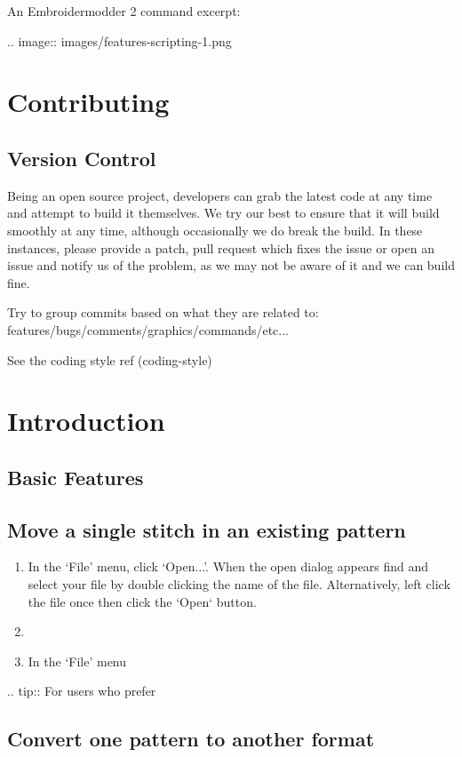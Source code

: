 \documentclass[11pt]{report}
\begin{document}
An Embroidermodder 2 command excerpt:

.. image::
   images/features-scripting-1.png

\section{Contributing}

\subsection{Version Control}

Being an open source project, developers can grab the latest code at any time
and attempt to build it themselves. We try our best to ensure that it will build smoothly
at any time, although occasionally we do break the build. In these instances,
please provide a patch, pull request which fixes the issue or open an issue and
notify us of the problem, as we may not be aware of it and we can build fine.

Try to group commits based on what they are related to: features/bugs/comments/graphics/commands/etc...

See the coding style ref (coding-style)

\section{Introduction}

\subsection{Basic Features}

\subsection{Move a single stitch in an existing pattern}

\begin{enumerate}
\item In the `File' menu, click `Open...'. When the open dialog appears find
 and select your file by double clicking the name of the file. Alternatively,
 left click the file once then click the `Open` button.
\item
\item In the `File' menu
\end{enumerate}

.. tip::
   For users who prefer

\subsection{Convert one pattern to another format}
\end{document}
